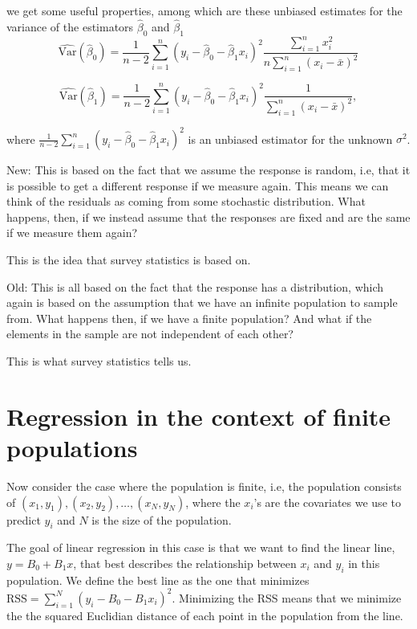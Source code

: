 \documentclass{article}
\begin{document}
we get some useful properties, among which are these unbiased estimates for the
variance of the estimators \(\hat{\beta}_0\) and \(\hat{\beta}_1\)
\begin{equation*}
 \widehat{\mathrm{Var}} \left( \hat{\beta}_0 \right) = \frac{1}{n - 2} \sum_{i = 1}^n\left( y_i - \hat{\beta}_0 -
 \hat{\beta}_1 x_i \right)^2 \frac{\sum_{i = 1}^n x_i^2}{n
   \sum_{i = 1}^n \left( x_i - \bar{x} \right)^2}
\end{equation*}
 

\begin{equation*}
 \widehat{\mathrm{Var}} \left( \hat{\beta}_1 \right) = \frac{1}{n - 2} \sum_{i = 1}^n\left( y_i - \hat{\beta}_0 -
 \hat{\beta}_1 x_i \right)^2\frac{1}{
   \sum_{i = 1}^n \left( x_i - \bar{x} \right)^2},
\end{equation*}

where \(\frac{1}{n - 2} \sum_{i = 1}^n\left( y_i - \hat{\beta}_0 -
 \hat{\beta}_1 x_i \right)^2\) is an
unbiased estimator for the unknown \(\sigma^2\).

New: This is based on the fact that we assume the response is random, i.e, that
it is possible to get a different response if we measure again. This means we
can think of the residuals as coming from some stochastic distribution. What
happens, then, if we instead assume that the responses are fixed and are the
same if we measure them again?

This is the idea that survey statistics is based on.

Old: This is all based on the fact that the response has a distribution, which again
is based on the assumption that we have an infinite population to sample from.
What happens then, if we have a finite population? And what if the elements in
the sample are not independent of each other?

This is what survey statistics tells us.



\section{Regression in the context of finite populations}
Now consider the case where the population is finite, i.e, the population
consists of \((x_1, y_1),
(x_2, y_2), \dots , (x_N, y_N)\), where the \(x_i\)'s are the covariates we use to
predict \(y_i\) and \(N\) is the size of the population.

The goal of linear regression in this case is that we want to find the linear
line, \(y = B_0 + B_1x\), that best describes the relationship between \(x_i\)
and \(y_i\) in this population. We define the best line as the one
that minimizes \(\mathrm{RSS} = \sum_{i = 1}^N (y_i - B_0 - B_1 x_i)^2\).
Minimizing the RSS means that we minimize the the squared Euclidian distance of each point
in the population from the line.
\end{document}
